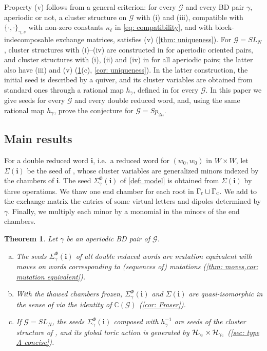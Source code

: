 \documentclass[a4paper]{amsart}
\numberwithin{equation}{section}
\newtheorem{theorem}{Theorem}[section]
\theoremstyle{definition}
\theoremstyle{remark}
\newcommand{\bbC}{\mathbb{C}}
\newcommand{\mcG}{\mathcal{G}}
\newcommand{\mcH}{\mathcal{H}}
\newcommand{\bfi}{\mathbf{i}}
\newcommand{\rr}{{\rm r}}
\newcommand{\cc}{{\rm c}}
\begin{document}
Property (v) follows from a general criterion: for every $\mcG$ and every BD pair $\gamma$, aperiodic or not, a cluster structure on $\mcG$ with (i) and (iii), compatible with $\{\cdot,\cdot\}_{\gamma,s}$ with non-zero constants $\kappa_\ell$ in \eqref{eq: compatibility}, and with block-indecomposable exchange matrices, satisfies (v) (\cref{thm: uniqueness}).
For $\mcG=SL_N$, cluster structures with (i)--(iv) are constructed in \cite[Theorem~3.3]{GSV19} for aperiodic oriented pairs, and cluster structures with (i), (ii) and (iv) in \cite{GSV23} for all aperiodic pairs; the latter also have (iii) and (v) (\cref{thm: A}(c), \cref{cor: uniqueness}). In the latter construction, the initial seed is described by a quiver, and its cluster variables are obtained from standard ones through a rational map $h_\gamma$, defined in \cite{GSV23} for every $\mcG$.
In this paper we give seeds for every $\mcG$ and every double reduced word, and, using the same rational map $h_\gamma$, prove the conjecture for $\mcG=Sp_{2n}$.

\subsection*{Main results}
For a double reduced word $\bfi$, i.e.\ a reduced word for $(w_0,w_0)$ in $W\times W$, let $\Sigma(\bfi)$ be the seed of \cite[Theorem~2.10]{BFZ05}, whose cluster variables are generalized minors indexed by the chambers of $\bfi$.
The seed $\Sigma^\Phi_\gamma(\bfi)$ of \cref{def: model} is obtained from $\Sigma(\bfi)$ by three operations.
We thaw one end chamber for each root in $\Gamma_{\rr}\sqcup\Gamma_{\cc}$.
We add to the exchange matrix the entries of some virtual letters and dipoles determined by $\gamma$.
Finally, we multiply each minor by a monomial in the minors of the end chambers.

\begin{theorem}
  \label{thm: A}
  Let $\gamma$ be an aperiodic BD pair of $\mcG$.
  \begin{enumerate}[(a)]
    \item The seeds $\Sigma^\Phi_\gamma(\bfi)$ of all double reduced words are mutation equivalent with moves on words corresponding to (sequences of) mutations (\cref{thm: moves,cor: mutation equivalent}).
    \item With the thawed chambers frozen, $\Sigma^\Phi_\gamma(\bfi)$ and $\Sigma(\bfi)$ are quasi-isomorphic in the sense of \cite{Fra16} via the identity of $\bbC(\mcG)$ (\cref{cor: Fraser}).
    \item If $\mcG=SL_N$, the seeds $\Sigma^\Phi_\gamma(\bfi)$ composed with $h_\gamma^{-1}$ are seeds of the cluster structure of \cite{GSV23}, and its global toric action is generated by $\mcH_{\gamma_{\rr}}\times\mcH_{\gamma_{\cc}}$ (\cref{sec: type A concise}).
  \end{enumerate}
\end{theorem}
\end{document}
